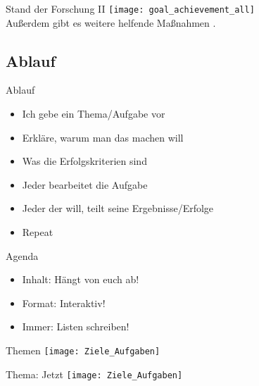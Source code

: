 \begin{frame}[c]{Stand der Forschung II}
    \texttt{[image: goal\_achievement\_all]} \\
    Außerdem gibt es weitere helfende Maßnahmen \cite{better-goals-2}.
\end{frame}



\subsection{Ablauf}


\begin{frame}[c]{Ablauf}
    \begin{itemize}[<+(1)->]
        \item Ich gebe ein Thema/Aufgabe vor
        \item Erkläre, warum man das machen will
        \item Was die Erfolgskriterien sind
        \item Jeder bearbeitet die Aufgabe
        \item Jeder der will, teilt seine Ergebnisse/Erfolge
        \item Repeat
    \end{itemize}
\end{frame}


\begin{frame}[c]{Agenda}
    \Large
    \begin{itemize}[<+(1)->]
        \item Inhalt: Hängt von euch ab!
        \item Format: Interaktiv!
        \item Immer: Listen schreiben!
    \end{itemize}
\end{frame}


\begin{frame}[c]{Themen}
    \texttt{[image: Ziele\_Aufgaben]}
\end{frame}


\begin{frame}[c]{Thema: Jetzt}
    \texttt{[image: Ziele\_Aufgaben]}
\end{frame}





